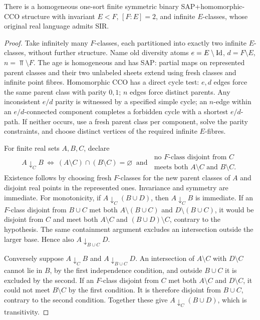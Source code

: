 \begin{proposition}
\label{prop:sir-relative-positive}
There is a homogeneous one-sort finite
symmetric binary SAP+homomorphic-CCO
structure with invariant \(E<F\),
\([F:E]=2\), and infinite \(E\)-classes,
whose original real language admits SIR.
\end{proposition}
\begin{proof}
Take infinitely many \(F\)-classes,
each partitioned into exactly two
infinite \(E\)-classes, without further
structure. Name old diversity atoms
\(e=E\setminus\mathrm{Id}\),
\(d=F\setminus E\),
\(n=\Top\setminus F\).
The age is homogeneous and has SAP:
partial maps on represented parent
classes and their two unlabeled
sheets extend using fresh classes and
infinite point fibres. Homomorphic
CCO has a direct cycle test:
\(e,d\) edges force the same parent
class with parity \(0,1\);
\(n\) edges force distinct parents.
Any inconsistent \(e/d\) parity
is witnessed by a specified simple
cycle; an \(n\)-edge within an
\(e/d\)-connected component completes
a forbidden cycle with a shortest
\(e/d\)-path. If neither occurs,
use a fresh parent class per
component, solve the parity constraints,
and choose distinct vertices of
the required infinite \(E\)-fibres.

For finite real sets \(A,B,C\), declare
\[
 A\downarrow_C B
 \ \Longleftrightarrow\
 (A\setminus C)\cap(B\setminus C)=\varnothing
 \ \text{ and }\ 
 \begin{gathered}
 \text{no \(F\)-class disjoint from \(C\)}\\
 \text{meets both \(A\setminus C\) and \(B\setminus C\).}
 \end{gathered}
 \tag{SIR-F}\label{eq:sir-F-indep}
\]
Existence follows by choosing fresh
\(F\)-classes for the new parent
classes of \(A\) and disjoint
real points in the represented ones.
Invariance and symmetry are immediate.
For monotonicity, if
\(A\downarrow_C(B\cup D)\),
then \(A\downarrow_C B\) is
immediate. If an \(F\)-class
disjoint from \(B\cup C\)
met both \(A\setminus(B\cup C)\)
and \(D\setminus(B\cup C)\),
it would be disjoint from \(C\)
and meet both \(A\setminus C\)
and \((B\cup D)\setminus C\),
contrary to the hypothesis.
The same containment argument
excludes an intersection outside
the larger base. Hence also
\(A\downarrow_{B\cup C}D\).

Conversely suppose
\(A\downarrow_C B\) and
\(A\downarrow_{B\cup C}D\).
An intersection of
\(A\setminus C\) with
\(D\setminus C\) cannot lie
in \(B\), by the first
independence condition, and
outside \(B\cup C\) it is
excluded by the second.
If an \(F\)-class disjoint
from \(C\) met both
\(A\setminus C\) and
\(D\setminus C\), it could
not meet \(B\setminus C\)
by the first condition.
It is therefore disjoint
from \(B\cup C\), contrary
to the second condition.
Together these give
\(A\downarrow_C(B\cup D)\),
which is transitivity.


\end{proof}
